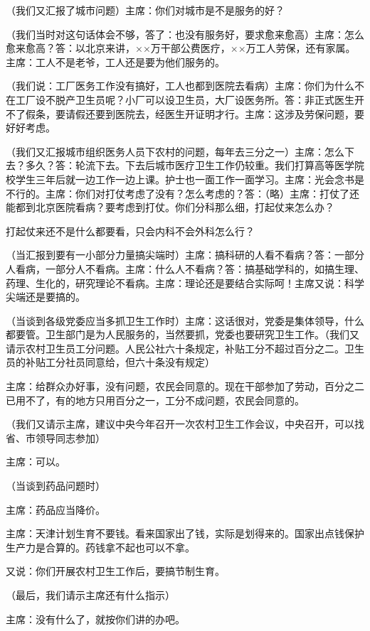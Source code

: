 （我们又汇报了城市问题）主席：你们对城市是不是服务的好？

（我们当时对这句话体会不够，答了：也没有服务好，要求愈来愈高）主席：怎么愈来愈高？答：以北京来讲，××万干部公费医疗，××万工人劳保，还有家属。主席：工人不是老爷，工人还是要为他们服务的。

（我们说：工厂医务工作没有搞好，工人也都到医院去看病）主席：你们为什么不在工厂设不脱产卫生员呢？小厂可以设卫生员，大厂设医务所。答：非正式医生开不了假条，要请假还要到医院去，经医生开证明才行。主席：这涉及劳保问题，要好好考虑。

（我们又汇报城市组织医务人员下农村的问题，每年去三分之一）主席：怎么下去？多久？答：轮流下去。下去后城市医疗卫生工作仍较重。我们打算高等医学院校学生三年后就一边工作一边上课。护士也一面工作一面学习。主席：光会念书是不行的。主席：你们对打仗考虑了没有？怎么考虑的？答：（略）主席：打仗了还能都到北京医院看病？要考虑到打仗。你们分科那么细，打起仗来怎么办？

打起仗来还不是什么都要看，只会内科不会外科怎么行？

（当汇报到要有一小部分力量搞尖端时）主席：搞科研的人看不看病？答：一部分人看病，一部分人不看病。主席：什么人不看病？答：搞基础学科的，如搞生理、药理、生化的，研究理论不看病。主席：理论还是要结合实际呵！主席又说：科学尖端还是要搞的。

（当谈到各级党委应当多抓卫生工作时）主席：这话很对，党委是集体领导，什么都要管。卫生部门是为人民服务的，当然要抓，党委也要研究卫生工作。（我们又请示农村卫生员工分问题。人民公社六十条规定，补贴工分不超过百分之二。卫生员的补贴工分社员同意给，但六十条没有规定）

主席：给群众办好事，没有问题，农民会同意的。现在干部参加了劳动，百分之二已用不了，有的地方只用百分之一，工分不成问题，农民会同意的。

（我们又请示主席，建议中央今年召开一次农村卫生工作会议，中央召开，可以找省、市领导同志参加）

主席：可以。

（当谈到药品问题时）

主席：药品应当降价。

主席：天津计划生育不要钱。看来国家出了钱，实际是划得来的。国家出点钱保护生产力是合算的。药钱拿不起也可以不拿。

又说：你们开展农村卫生工作后，要搞节制生育。

（最后，我们请示主席还有什么指示）

主席：没有什么了，就按你们讲的办吧。


